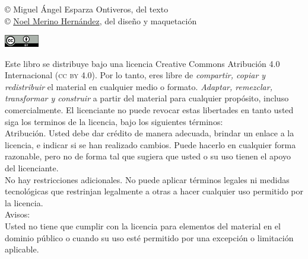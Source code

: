\documentclass[11pt,a5paper,twoside]{book} %
\begin{document}
\begin{flushleft}
\begin{tiny}
\noindent \copyright {} Miguel Ángel Esparza Ontiveros, del texto \\
\noindent \copyright {} \href{noel_merino@yahoo.com.mx}{Noel Merino Hernández}, del diseño y maquetación \\
\end{tiny}
\end{flushleft}
\begin{minipage}{5cm}
\begin{tiny}

\begin{minipage}{5cm}
\includegraphics[width=1.5cm]{01}\label{fig:01} \\
\end{minipage}

\noindent Este libro se distribuye bajo una licencia Creative Commons Atribución 4.0 Internacional (\textsc{cc by} {4.0}). Por lo tanto, eres libre de \emph{compartir, copiar y redistribuir} el material en cualquier medio o formato. \emph{Adaptar, remezclar, transformar y construir} a partir del material para cualquier propósito, incluso comercialmente. El licenciante no puede revocar estas libertades en tanto usted siga los terminos de la licencia, bajo los siguientes términos: \\

\noindent \ccAttribution \thinspace Atribución. Usted debe dar crédito de manera adecuada, brindar un enlace a la licencia, e indicar si se han realizado cambios. Puede hacerlo en cualquier forma razonable, pero no de forma tal que sugiera que usted o su uso tienen el apoyo del licenciante. \\

\noindent No hay restricciones adicionales. No puede aplicar términos legales ni medidas tecnológicas que restrinjan legalmente a otras a hacer cualquier uso permitido por la licencia. \\

\noindent Avisos: \\

\noindent Usted no tiene que cumplir con la licencia para elementos del material en el dominio público o cuando su uso esté permitido por una excepción o limitación aplicable. \\


\end{tiny}
\end{minipage}
\end{document}
